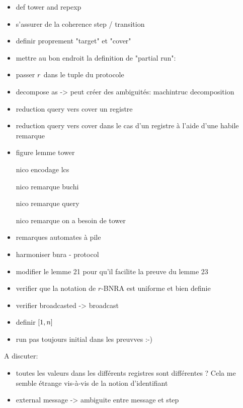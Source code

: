 \begin{itemize}
\item def tower and repexp
\item s'assurer de la coherence step / transition
\item definir proprement "target" et "cover"
\item mettre au bon endroit la definition de "partial run": 
    \item passer $r$ dans le tuple du protocole
    \item decompose as -> peut créer des ambiguités: machintruc decomposition 
    \item reduction query vers cover un registre
    \item reduction query vers cover dans le cas d'un registre à l'aide d'une habile remarque
    \item figure lemme tower
    \item[nico] encodage lcs
    \item[nico] remarque buchi
    \item[nico] remarque query 
    \item[nico] remarque on a besoin de tower
    \item remarques automates à pile    
    \item harmoniser bnra - protocol
    \item modifier le lemme 21 pour qu'il facilite la preuve du lemme 23
    \item verifier que la notation de $r$-BNRA est uniforme et bien definie
    \item  verifier broadcasted -> broadcast
    \item definir $[1,n]$
    \item run pas toujours initial dans les preuvves :-)
\end{itemize}

A discuter:
\begin{itemize}
\item toutes les valeurs dans les différents registres sont différentes ? Cela me semble étrange vis-à-vis de la notion d'identifiant
\item external message -> ambiguite entre message et step 
\end{itemize}